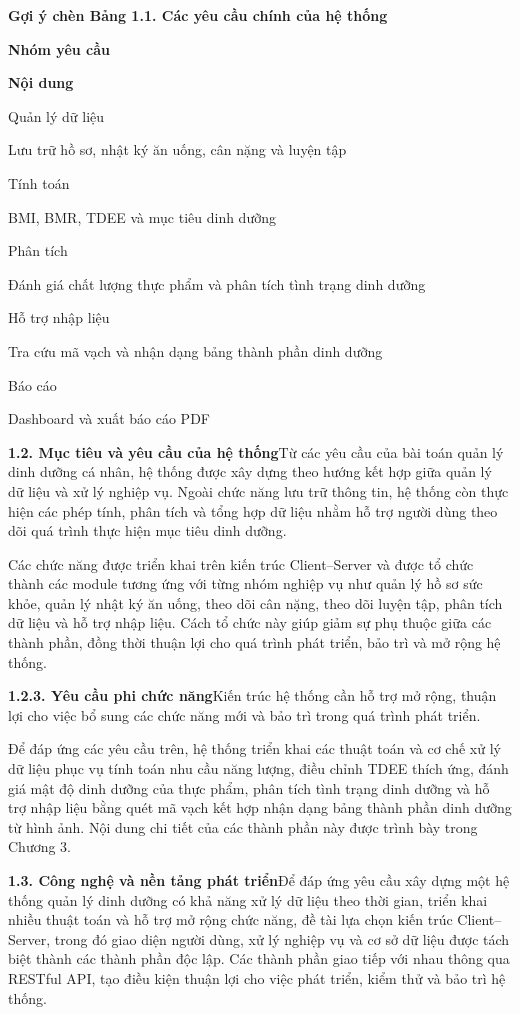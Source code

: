\textbf{Gợi ý chèn Bảng 1.1. Các yêu cầu chính của hệ thống}

\textbf{Nhóm yêu cầu}

\textbf{Nội dung}

Quản lý dữ liệu

Lưu trữ hồ sơ, nhật ký ăn uống, cân nặng và luyện tập

Tính toán

BMI, BMR, TDEE và mục tiêu dinh dưỡng

Phân tích

Đánh giá chất lượng thực phẩm và phân tích tình trạng dinh dưỡng

Hỗ trợ nhập liệu

Tra cứu mã vạch và nhận dạng bảng thành phần dinh dưỡng

Báo cáo

Dashboard và xuất báo cáo PDF

\textbf{1.2. Mục tiêu và yêu cầu của hệ thống}Từ các yêu cầu của bài toán quản lý dinh dưỡng cá nhân, hệ thống được xây dựng theo hướng kết hợp giữa quản lý dữ liệu và xử lý nghiệp vụ. Ngoài chức năng lưu trữ thông tin, hệ thống còn thực hiện các phép tính, phân tích và tổng hợp dữ liệu nhằm hỗ trợ người dùng theo dõi quá trình thực hiện mục tiêu dinh dưỡng.

Các chức năng được triển khai trên kiến trúc Client–Server và được tổ chức thành các module tương ứng với từng nhóm nghiệp vụ như quản lý hồ sơ sức khỏe, quản lý nhật ký ăn uống, theo dõi cân nặng, theo dõi luyện tập, phân tích dữ liệu và hỗ trợ nhập liệu. Cách tổ chức này giúp giảm sự phụ thuộc giữa các thành phần, đồng thời thuận lợi cho quá trình phát triển, bảo trì và mở rộng hệ thống.

\textbf{1.2.3. Yêu cầu phi chức năng}Kiến trúc hệ thống cần hỗ trợ mở rộng, thuận lợi cho việc bổ sung các chức năng mới và bảo trì trong quá trình phát triển.

Để đáp ứng các yêu cầu trên, hệ thống triển khai các thuật toán và cơ chế xử lý dữ liệu phục vụ tính toán nhu cầu năng lượng, điều chỉnh TDEE thích ứng, đánh giá mật độ dinh dưỡng của thực phẩm, phân tích tình trạng dinh dưỡng và hỗ trợ nhập liệu bằng quét mã vạch kết hợp nhận dạng bảng thành phần dinh dưỡng từ hình ảnh. Nội dung chi tiết của các thành phần này được trình bày trong Chương 3.

\textbf{1.3. Công nghệ và nền tảng phát triển}Để đáp ứng yêu cầu xây dựng một hệ thống quản lý dinh dưỡng có khả năng xử lý dữ liệu theo thời gian, triển khai nhiều thuật toán và hỗ trợ mở rộng chức năng, đề tài lựa chọn kiến trúc Client–Server, trong đó giao diện người dùng, xử lý nghiệp vụ và cơ sở dữ liệu được tách biệt thành các thành phần độc lập. Các thành phần giao tiếp với nhau thông qua RESTful API, tạo điều kiện thuận lợi cho việc phát triển, kiểm thử và bảo trì hệ thống.

